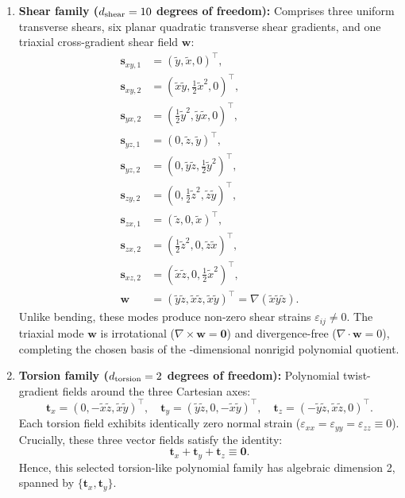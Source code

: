\documentclass[pdflatex,sn-basic]{sn-jnl}
\begin{document}
\begin{enumerate}[label=(\roman*)]
\item \textbf{Shear family ($d_{\rm shear} = 10$ degrees of freedom):}
Comprises three uniform transverse shears, six planar quadratic transverse shear gradients, and one triaxial cross-gradient shear field $\mathbf w$:
\begin{equation}
\begin{aligned}
\mathbf s_{xy,1} &= (\tilde y, \tilde x, 0)^\top, \\
 \mathbf s_{xy,2} &= (\tilde x \tilde y, \tfrac{1}{2}\tilde x^2, 0)^\top, \\
 \mathbf s_{yx,2} &= (\tfrac{1}{2}\tilde y^2, \tilde y \tilde x, 0)^\top, \\
\mathbf s_{yz,1} &= (0, \tilde z, \tilde y)^\top, \\
 \mathbf s_{yz,2} &= (0, \tilde y \tilde z, \tfrac{1}{2}\tilde y^2)^\top, \\
 \mathbf s_{zy,2} &= (0, \tfrac{1}{2}\tilde z^2, \tilde z \tilde y)^\top, \\
\mathbf s_{zx,1} &= (\tilde z, 0, \tilde x)^\top, \\
 \mathbf s_{zx,2} &= (\tfrac{1}{2}\tilde z^2, 0, \tilde z \tilde x)^\top, \\
 \mathbf s_{xz,2} &= (\tilde x \tilde z, 0, \tfrac{1}{2}\tilde x^2)^\top, \\
\mathbf w &= (\tilde y \tilde z, \tilde x \tilde z, \tilde x \tilde y)^\top = \nabla(\tilde x \tilde y \tilde z).
\end{aligned}
\label{eq:shear-family}
\end{equation}
Unlike bending, these modes produce non-zero shear strains $\varepsilon_{ij} \ne 0$.
The triaxial mode $\mathbf w$ is irrotational ($\nabla \times \mathbf w = \mathbf 0$) and divergence-free ($\nabla \cdot \mathbf w = 0$), completing the chosen basis of the \NonrigidDOFs-dimensional nonrigid polynomial quotient.

\item \textbf{Torsion family ($d_{\rm torsion} = 2$ degrees of freedom):}
Polynomial twist-gradient fields around the three Cartesian axes:
\begin{equation}
\mathbf t_x = (0, -\tilde x \tilde z, \tilde x \tilde y)^\top, \quad
\mathbf t_y = (\tilde y \tilde z, 0, -\tilde x \tilde y)^\top, \quad
\mathbf t_z = (-\tilde y \tilde z, \tilde x \tilde z, 0)^\top.
\label{eq:torsion-family}
\end{equation}
Each torsion field exhibits identically zero normal strain ($\varepsilon_{xx} = \varepsilon_{yy} = \varepsilon_{zz} \equiv 0$).
Crucially, these three vector fields satisfy the identity:
\begin{equation}
\mathbf t_x + \mathbf t_y + \mathbf t_z \equiv \mathbf 0.
\end{equation}
Hence, this selected torsion-like polynomial family has algebraic dimension 2, spanned by $\{\mathbf t_x, \mathbf t_y\}$.
\end{enumerate}
\end{document}
